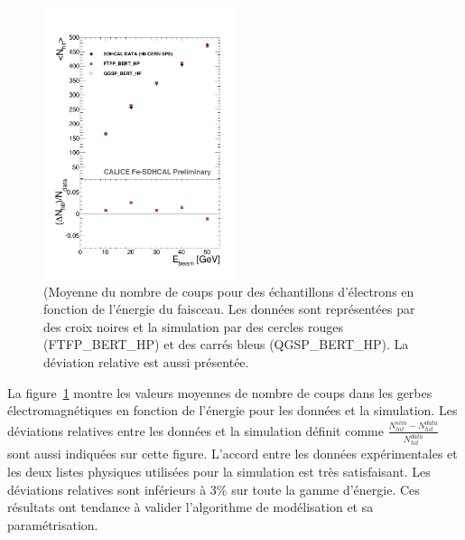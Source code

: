 \begin{figure}[!ht]
  \centering
  \includegraphics[width=0.5\textwidth]{Digitizer/figs/NHITELECTRON.pdf}
  \caption{(Moyenne du nombre de coups pour des échantillons d'électrons en fonction de l’énergie du faisceau. Les données sont représentées par des croix noires et la simulation par des cercles rouges (FTFP\_BERT\_HP) et des carrés bleus (QGSP\_BERT\_HP). La déviation relative est aussi présentée.}
  \label{fig.nhite-}
\end{figure}
La figure~\ref{fig.nhite-} montre les valeurs moyennes de nombre de coups dans les gerbes électromagnétiques en fonction de l'énergie pour les données et la simulation. Les déviations relatives entre les données et la simulation définit comme $\frac{N_{hit}^{sim}-N_{hit}^{data}}{N_{hit}^{data}}$ sont aussi indiquées sur cette figure. L'accord entre les données expérimentales et les deux listes physiques utilisées pour la simulation est très satisfaisant. Les déviations relatives sont inférieurs à 3\% sur toute la gamme d'énergie. Ces résultats ont tendance à valider l'algorithme de modélisation et sa paramétrisation. 


